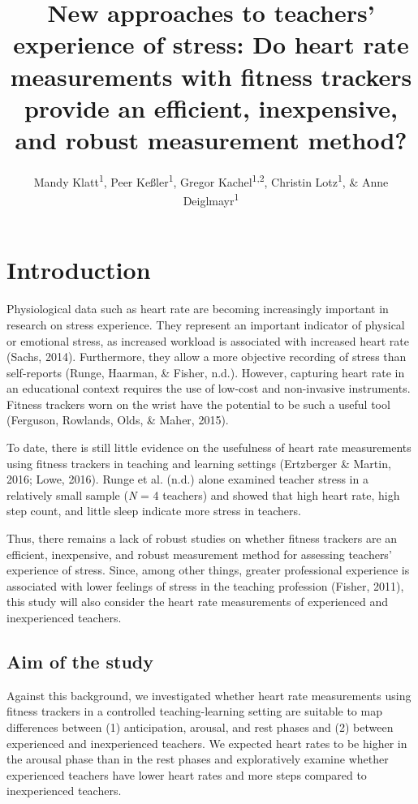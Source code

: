 \documentclass[
  man]{apa6}
\title{New approaches to teachers' experience of stress: Do heart rate measurements with fitness trackers provide an efficient, inexpensive, and robust measurement method?}
\author{Mandy Klatt\textsuperscript{1}, Peer Keßler\textsuperscript{1}, Gregor Kachel\textsuperscript{1,2}, Christin Lotz\textsuperscript{1}, \& Anne Deiglmayr\textsuperscript{1}}
\date{}
\affiliation{\vspace{0.5cm}\textsuperscript{1} Leipzig University\\\textsuperscript{2} Max Planck Institute for Evolutionary Anthropology}
\begin{document}
\maketitle

\hypertarget{introduction}{%
\section{Introduction}\label{introduction}}

Physiological data such as heart rate are becoming increasingly important in research on stress experience. They represent an important indicator of physical or emotional stress, as increased workload is associated with increased heart rate (Sachs, 2014). Furthermore, they allow a more objective recording of stress than self-reports (Runge, Haarman, \& Fisher, n.d.). However, capturing heart rate in an educational context requires the use of low-cost and non-invasive instruments. Fitness trackers worn on the wrist have the potential to be such a useful tool (Ferguson, Rowlands, Olds, \& Maher, 2015).

To date, there is still little evidence on the usefulness of heart rate measurements using fitness trackers in teaching and learning settings (Ertzberger \& Martin, 2016; Lowe, 2016). Runge et al. (n.d.) alone examined teacher stress in a relatively small sample (\emph{N} = 4 teachers) and showed that high heart rate, high step count, and little sleep indicate more stress in teachers.

Thus, there remains a lack of robust studies on whether fitness trackers are an efficient, inexpensive, and robust measurement method for assessing teachers' experience of stress. Since, among other things, greater professional experience is associated with lower feelings of stress in the teaching profession (Fisher, 2011), this study will also consider the heart rate measurements of experienced and inexperienced teachers.

\hypertarget{aim-of-the-study}{%
\subsection{Aim of the study}\label{aim-of-the-study}}

Against this background, we investigated whether heart rate measurements using fitness trackers in a controlled teaching-learning setting are suitable to map differences between (1) anticipation, arousal, and rest phases and (2) between experienced and inexperienced teachers. We expected heart rates to be higher in the arousal phase than in the rest phases and exploratively examine whether experienced teachers have lower heart rates and more steps compared to inexperienced teachers.
\end{document}
